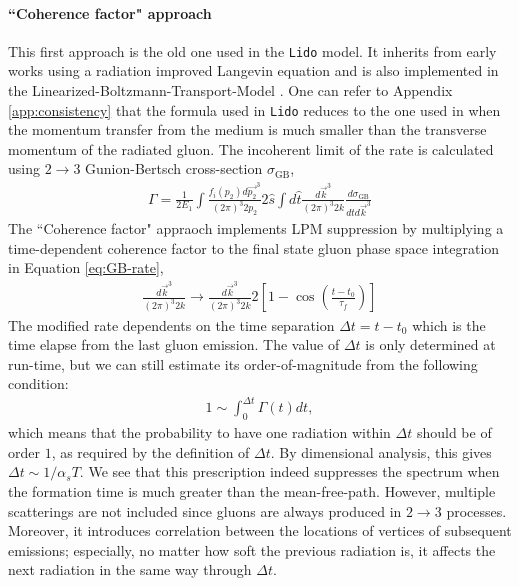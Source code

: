 \documentclass[aps, prc, reprint, amsmath, groupedaddress, nofootinbib]{revtex4-1}
\begin{document}
\paragraph*{``Coherence factor" approach} This first approach is the old one used in the {\tt Lido} model. 
It inherits from early works using a radiation improved Langevin equation \cite{Cao:2013ita} and is also implemented in the Linearized-Boltzmann-Transport-Model \cite{Cao:2016gvr,Cao:2017hhk}. 
One can refer to Appendix \ref{app:consistency} that the formula used in {\tt Lido} reduces to the one used in \cite{Cao:2013ita} when the momentum transfer from the medium is much smaller than the transverse momentum of the radiated gluon.
The incoherent limit of the rate is calculated using $2\rightarrow 3$ Gunion-Bertsch cross-section $\sigma_\textrm{GB}$,
\begin{eqnarray}\label{eq:GB-rate}
\Gamma = \frac{1}{2E_1}\int\frac{f_i(p_2)d\vec{p_2}^3}{(2\pi)^3 2p_2}2\hat{s}\int d\hat{t}\frac{d\vec{k}^3}{(2\pi)^3 2k}\frac{d\sigma_{\textrm{GB}}}{d\hat{t}d\vec{k}^3}
\end{eqnarray}
The ``Coherence factor" appraoch implements LPM suppression by multiplying a time-dependent coherence factor to the final state gluon phase space integration in Equation \ref{eq:GB-rate},
\begin{eqnarray}\label{eq:GB-rate-LPM}
\frac{d\vec{k}^3}{(2\pi)^3 2k} \rightarrow \frac{d\vec{k}^3}{(2\pi)^3 2k} 2\left[1-\cos\left(\frac{t-t_0}{\tau_f}\right)\right]
\end{eqnarray}
The modified rate dependents on the time separation $\Delta t = t-t_0$ which is the time elapse from the last gluon emission.
The value of $\Delta t$ is only determined at run-time,
but we can still estimate its order-of-magnitude from the following condition:
\begin{eqnarray}
1 \sim \int_0^{\Delta t}\Gamma(t) dt,
\end{eqnarray}
which means that the probability to have one radiation within $\Delta t$ should be of order $1$, as required by the definition of $\Delta t$.
By dimensional analysis, this gives $\Delta t \sim 1/\alpha_s T$.
We see that this prescription indeed suppresses the spectrum when the formation time is much greater than the mean-free-path. 
However, multiple scatterings are not included since gluons are always produced in $2\rightarrow3$ processes.
Moreover, it introduces correlation between the locations of vertices of subsequent emissions;
especially, no matter how soft the previous radiation is, it affects the next radiation in the same way through $\Delta t$.
\end{document}
